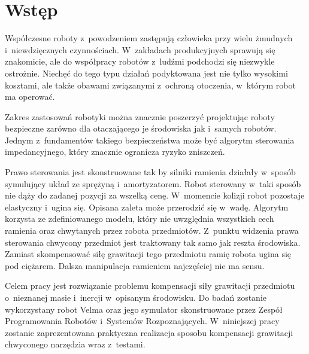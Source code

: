 
\chapter{Wstęp\label{chap:wstep}}

	Współczesne roboty z~powodzeniem zastępują człowieka przy wielu żmudnych i~niewdzięcznych czynnościach.  W~zakładach produkcyjnych sprawują się znakomicie, ale do współpracy robotów z~ludźmi podchodzi się niezwykle ostrożnie. Niechęć do tego typu działań podyktowana jest nie tylko wysokimi kosztami, ale także obawami związanymi z~ochroną otoczenia, w~którym robot ma operować.
	
	Zakres zastosowań robotyki można znacznie poszerzyć projektując roboty bezpieczne zarówno dla otaczającego je środowiska jak i~samych robotów. Jednym z~fundamentów takiego bezpieczeństwa może być algorytm sterowania impedancyjnego, który znacznie ogranicza ryzyko zniszczeń. 
	
	Prawo sterowania jest skonstruowane tak by silniki ramienia działały w~sposób symulujący układ ze sprężyną i~amortyzatorem. Robot sterowany w~taki sposób nie dąży do zadanej pozycji za wszelką cenę. W~momencie kolizji robot pozostaje elastyczny i~ugina się. Opisana zaleta może przerodzić się w~wadę. Algorytm korzysta ze zdefiniowanego modelu, który nie uwzględnia wszystkich cech ramienia oraz chwytanych przez robota przedmiotów. Z~punktu widzenia prawa sterowania chwycony przedmiot jest traktowany tak samo jak reszta środowiska. Zamiast skompensować siłę grawitacji tego przedmiotu ramię robota ugina się pod ciężarem. Dalsza manipulacja ramieniem najczęściej nie ma 
	sensu. 

	Celem pracy jest rozwiązanie problemu kompensacji siły grawitacji przedmiotu o~nieznanej masie i~inercji w~opisanym środowisku. 
	Do badań zostanie wykorzystany robot Velma oraz jego symulator skonstruowane przez Zespół Programowania Robotów i~Systemów Rozpoznających. W~niniejszej pracy zostanie zaprezentowana praktyczna realizacja sposobu kompensacji grawitacji chwyconego narzędzia wraz z~testami.
